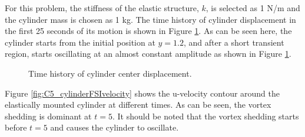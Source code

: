 For this problem, the stiffness of the elastic structure, $k$, is selected as 1 N/m and the cylinder mass is chosen as 1 kg. The time history of cylinder displacement in the first 25 seconds of its motion is shown in Figure \ref{fig:C5_cylinderDisplacement}. As can be seen here, the cylinder starts from the initial position at $y=1.2$, and after a short transient region, starts oscillating at an almost constant amplitude as shown in Figure \ref{fig:C5_cylinderDisplacement}.
%
\begin{figure}[H]
    \centering
    \quad
    \caption{Time history of cylinder center displacement.}
    \label{fig:C5_cylinderDisplacement}
\end{figure}
%
Figure \ref{fig:C5_cylinderFSIvelocity} shows the u-velocity contour around the elastically mounted cylinder at different times. As can be seen, the vortex shedding is dominant at $t=5$. It should be noted that the vortex shedding starts before $t=5$ and causes the cylinder to oscillate.
%
